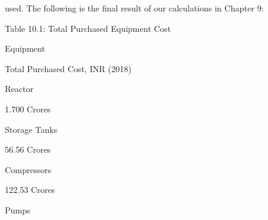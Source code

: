 \documentclass[a4paper,portrait,12pt]{article}
\begin{document}
\begin{flushleft}
used. The following is the final result of our calculations in Chapter 9:
\end{flushleft}


\begin{flushleft}
Table 10.1: Total Purchased Equipment Cost
\end{flushleft}





\begin{flushleft}
Equipment
\end{flushleft}





\begin{flushleft}
Total Purchased Cost, INR (2018)
\end{flushleft}





\begin{flushleft}
Reactor
\end{flushleft}





\begin{flushleft}
1.700 Crores
\end{flushleft}





\begin{flushleft}
Storage Tanks
\end{flushleft}





\begin{flushleft}
56.56 Crores
\end{flushleft}





\begin{flushleft}
Compressors
\end{flushleft}





\begin{flushleft}
122.53 Crores
\end{flushleft}





\begin{flushleft}
Pumps
\end{flushleft}
\end{document}
